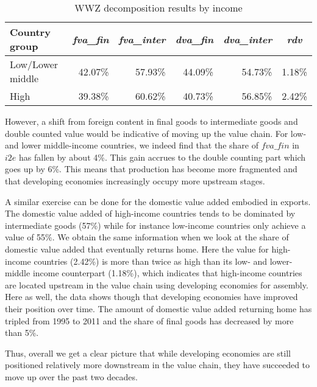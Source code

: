 \documentclass[11pt,a4paper]{article}
\begin{document}
\begin{table}[htbp]\small
  \centering
  \caption{WWZ decomposition results by income}
    \begin{tabular}{lrrrrr}
    \toprule
    Country group & \multicolumn{1}{c}{\textit{fva\_fin}} & \multicolumn{1}{c}{\textit{fva\_inter}} & \multicolumn{1}{c}{\textit{dva\_fin}} & \multicolumn{1}{c}{\textit{dva\_inter}} & \multicolumn{1}{c}{\textit{rdv}} \\
    \midrule
    Low/Lower middle & 42.07\% & 57.93\% & 44.09\% & 54.73\% & 1.18\% \\
    High  & 39.38\% & 60.62\% & 40.73\% & 56.85\% & 2.42\% \\
    \bottomrule
    \end{tabular}
  \label{tab:wwz}
\end{table}

However, a shift from foreign content in final goods to intermediate goods and double counted value would be indicative of moving up the value chain. For low- and lower middle-income countries, we indeed find that the share of $fva\_fin$ in $i2e$ has fallen by about 4\%. This gain accrues to the double counting part which goes up by 6\%. This means that production has become more fragmented and that developing economies increasingly occupy more upstream stages.

A similar exercise can be done for the domestic value added embodied in exports. The domestic value added of high-income countries tends to be dominated by intermediate goods (57\%) while for instance low-income countries only achieve a value of 55\%. We obtain the same information when we look at the share of domestic value added that eventually returns home. Here the value for high-income countries (2.42\%) is more than twice as high than its low- and lower-middle income counterpart (1.18\%), which indicates that high-income countries are located upstream in the value chain using developing economies for assembly. Here as well, the data shows though that developing economies have improved their position over time. The amount of domestic value added returning home has tripled from 1995 to 2011 and the share of final goods has decreased by more than 5\%. 


Thus, overall we get a clear picture that while developing economies are still positioned relatively more downstream in the value chain, they have succeeded to move up over the past two decades.
\end{document}
